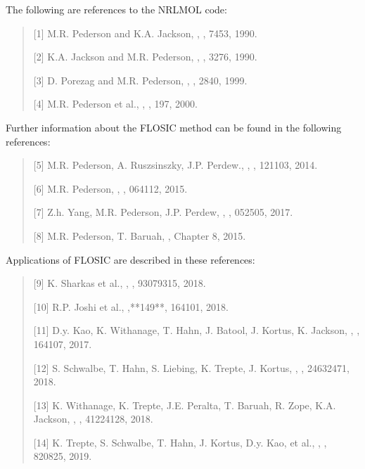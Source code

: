 \documentclass[letterpaper,10pt,english,openany,oneside]{sphinxmanual}
\begin{document}
\sphinxAtStartPar
The following are references to the NRLMOL code:
\begin{quote}

\sphinxAtStartPar
{[}1{]} M.R. Pederson and K.A. Jackson, , , 7453, 1990.

\sphinxAtStartPar
{[}2{]} K.A. Jackson and M.R. Pederson, , , 3276, 1990.

\sphinxAtStartPar
{[}3{]} D. Porezag and M.R. Pederson, , , 2840, 1999.

\sphinxAtStartPar
{[}4{]} M.R. Pederson et al., , , 197, 2000.
\end{quote}

\sphinxAtStartPar
Further information about the FLO\sphinxhyphen{}SIC method can be found in the following references:
\begin{quote}

\sphinxAtStartPar
{[}5{]} M.R. Pederson, A. Ruszsinszky, J.P. Perdew., , , 121103, 2014.

\sphinxAtStartPar
{[}6{]} M.R. Pederson, , , 064112, 2015.

\sphinxAtStartPar
{[}7{]} Z.\sphinxhyphen{}h. Yang, M.R. Pederson, J.P. Perdew, , , 052505, 2017.

\sphinxAtStartPar
{[}8{]} M.R. Pederson, T. Baruah, , Chapter 8, 2015.
\end{quote}

\sphinxAtStartPar
Applications of FLO\sphinxhyphen{}SIC are described in these references:
\begin{quote}

\sphinxAtStartPar
{[}9{]} K. Sharkas et al., , , 9307\sphinxhyphen{}9315, 2018.

\sphinxAtStartPar
{[}10{]} R.P. Joshi et al., ,**149**, 164101, 2018.

\sphinxAtStartPar
{[}11{]} D.\sphinxhyphen{}y. Kao, K. Withanage, T. Hahn, J. Batool, J. Kortus, K. Jackson, , , 164107, 2017.

\sphinxAtStartPar
{[}12{]} S. Schwalbe, T. Hahn, S. Liebing, K. Trepte, J. Kortus, , , 2463\sphinxhyphen{}2471, 2018.

\sphinxAtStartPar
{[}13{]} K. Withanage, K. Trepte, J.E. Peralta, T. Baruah, R. Zope, K.A. Jackson, , , 4122\sphinxhyphen{}4128, 2018.

\sphinxAtStartPar
{[}14{]} K. Trepte, S. Schwalbe, T. Hahn, J. Kortus, D.\sphinxhyphen{}y. Kao, et al., , , 820\sphinxhyphen{}825, 2019.
\end{quote}
\end{document}
